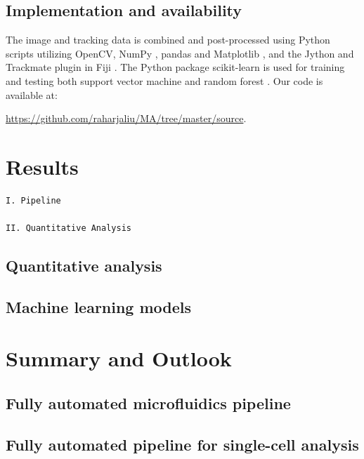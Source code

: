 \documentclass[pdftex,12pt,a4paper]{report}
\begin{document}
\section{Implementation and availability}

The image and tracking data is combined and post-processed using Python scripts utilizing OpenCV\cite{bradski2008learning}, NumPy \cite{walt2011numpy}, pandas \cite{mckinney2010data} and Matplotlib \cite{hunter2007matplotlib}, and the Jython and Trackmate \cite{tinevez2017trackmate, pedroni2002jython} plugin in Fiji \cite{schindelin2012fiji}. The Python package scikit-learn is used for training and testing both support vector machine and random forest \cite{scikit-learn}. Our code is available at:

\href{https://github.com/raharjaliu/MA/tree/master/source}{https://github.com/raharjaliu/MA/tree/master/source}.

\chapter{Results}


\begin{verbatim}
I. Pipeline

II. Quantitative Analysis
\end{verbatim}

\section{Quantitative analysis}

\section{Machine learning models}
\label{section:ml_results}

\chapter{Summary and Outlook}


\section{Fully automated microfluidics pipeline}

\section{Fully automated pipeline for single-cell analysis}
\end{document}
